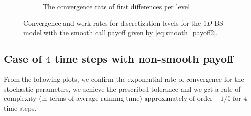 \documentclass[11pt]{article}
\begin{document}
\begin{figure}[!h]
\begin{subfigure}{.5\textwidth}
		\caption{ The convergence rate of first differences per level}
		\label{fig:misc_1D_BS_2_steps_smooth_second_payoff_eps_10_5_sub4}
	\end{subfigure}%
	\caption{Convergence and work rates for discretization levels for the $1D$ BS model with the smooth call payoff given by \eqref{eq:smooth_payoff2}.}
	\label{fig:misc_1D_BS_2_steps_smooth_second_payoff_eps_10_5_2}
\end{figure}


\newpage




\subsection{Case of $4$ time steps with non-smooth payoff}

From the following plots, we confirm the exponential rate of convergence for the stochastic parameters, we achieve the prescribed tolerance and  we get a rate of complexity (in terms of average running time) approximately of order $-1/5$ for $4$ time steps.
\end{document}
